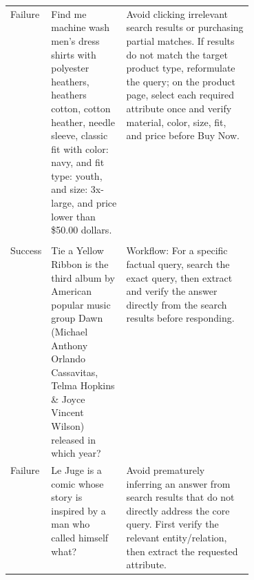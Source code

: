 \begin{table}[ht!]
\begin{tabularx}{\textwidth}{
  >{\raggedright\arraybackslash}p{0.10\linewidth}
  >{\raggedright\arraybackslash}p{0.31\linewidth}
  >{\raggedright\arraybackslash}X
}
Failure &
Find me machine wash men's dress shirts with polyester heathers, heathers
cotton, cotton heather, needle sleeve, classic fit with color: navy, and fit
type: youth, and size: 3x-large, and price lower than \$50.00 dollars. &
Avoid clicking irrelevant search results or purchasing partial matches. If
results do not match the target product type, reformulate the query; on the
product page, select each required attribute once and verify material, color,
size, fit, and price before Buy Now. \\

\addlinespace
\rowcolor{gray!15}
\multicolumn{3}{l}{\textbf{Search}} \\

Success &
Tie a Yellow Ribbon is the third album by American popular music group Dawn
(Michael Anthony Orlando Cassavitas, Telma Hopkins \& Joyce Vincent Wilson)
released in which year? &
Workflow: For a specific factual query, search the exact query, then extract
and verify the answer directly from the search results before responding. \\

Failure &
Le Juge is a comic whose story is inspired by a man who called himself what? &
Avoid prematurely inferring an answer from search results that do not directly
address the core query. First verify the relevant entity/relation, then extract
the requested attribute. \\

\bottomrule
\end{tabularx}
\end{table}



